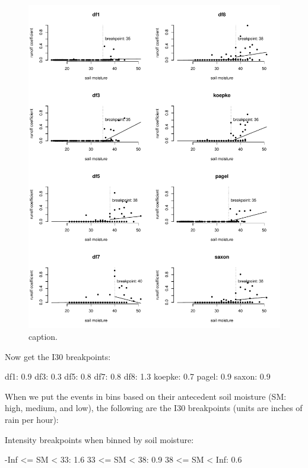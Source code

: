 \documentclass[12pt]{article}
\begin{document}
\begin{figure}
    \begin{center}
\includegraphics{runoff-sm}
    \end{center}
    \caption{caption.\label{sm}}
\end{figure}


Now get the I30 breakpoints:\\

\begin{Schunk}
\begin{Soutput}
df1: 0.9
df3: 0.3
df5: 0.8
df7: 0.8
df8: 1.3
koepke: 0.7
pagel: 0.9
saxon: 0.9
\end{Soutput}
\end{Schunk}


When we put the events in bins based on their antecedent soil moisture (SM: high, medium, and low), the following are the I30 breakpoints (units are inches of rain per hour):\\

\begin{Schunk}
\begin{Soutput}
Intensity breakpoints when binned by soil moisture:
\end{Soutput}
\begin{Soutput}
-Inf <= SM < 33: 1.6
33 <= SM < 38: 0.9
38 <= SM < Inf: 0.6
\end{Soutput}
\end{Schunk}
\end{document}
